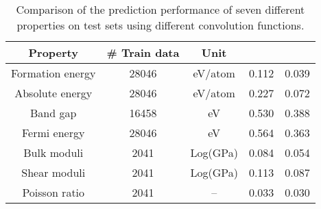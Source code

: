 \documentclass[twocolumn, prl]{revtex4-1}
\begin{document}
\begin{table}[htb]\caption{Comparison of the prediction performance of seven different properties on test sets using different convolution functions.}
\begin{ruledtabular}
\begin{tabular}{ccccc}
  Property    & \# Train data		&	Unit   &    &  \\
  \hline
  Formation energy & 28046    		&  eV/atom  & 0.112 					&	0.039\\
  Absolute energy	& 28046			&  eV/atom	& 0.227					&	0.072\\
  Band gap			& 16458			&  eV		& 0.530					&	0.388\\
  Fermi energy		& 28046			&  eV		& 0.564					&	0.363\\
  Bulk moduli		& 2041 			&  Log(GPa)	& 0.084					&	0.054\\
  Shear moduli		& 2041			&  Log(GPa) & 0.113					&	0.087\\
  Poisson ratio		& 2041			& --			& 0.033					&	0.030\\

\end{tabular}
\end{ruledtabular}
\label{tab:general-param}
\end{table}
\end{document}
